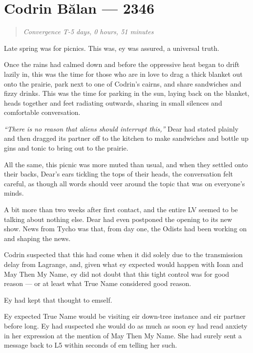 \hypertarget{codrin-bux103lan-2346}{%
\chapter{Codrin Bălan — 2346}\label{codrin-bux103lan-2346}}

\begin{quote}
\emph{Convergence T-5 days, 0 hours, 51 minutes}
\end{quote}

Late spring was for picnics. This was, ey was assured, a universal truth.

Once the rains had calmed down and before the oppressive heat began to drift lazily in, this was the time for those who are in love to drag a thick blanket out onto the prairie, park next to one of Codrin's cairns, and share sandwiches and fizzy drinks. This was the time for parking in the sun, laying back on the blanket, heads together and feet radiating outwards, sharing in small silences and comfortable conversation.

\emph{``There is no reason that aliens should interrupt this,''} Dear had stated plainly and then dragged its partner off to the kitchen to make sandwiches and bottle up gins and tonic to bring out to the prairie.

All the same, this picnic was more muted than usual, and when they settled onto their backs, Dear's ears tickling the tops of their heads, the conversation felt careful, as though all words should veer around the topic that was on everyone's minds.

A bit more than two weeks after first contact, and the entire LV seemed to be talking about nothing else. Dear had even postponed the opening to its new show. News from Tycho was that, from day one, the Odists had been working on and shaping the news.

Codrin suspected that this had come when it did solely due to the transmission delay from Lagrange, and, given what ey expected would happen with Ioan and May Then My Name, ey did not doubt that this tight control was for good reason — or at least what True Name considered good reason.

Ey had kept that thought to emself.

Ey expected True Name would be visiting eir down-tree instance and eir partner before long. Ey had suspected she would do as much as soon ey had read anxiety in her expression at the mention of May Then My Name. She had surely sent a message back to L5 within seconds of em telling her such.

